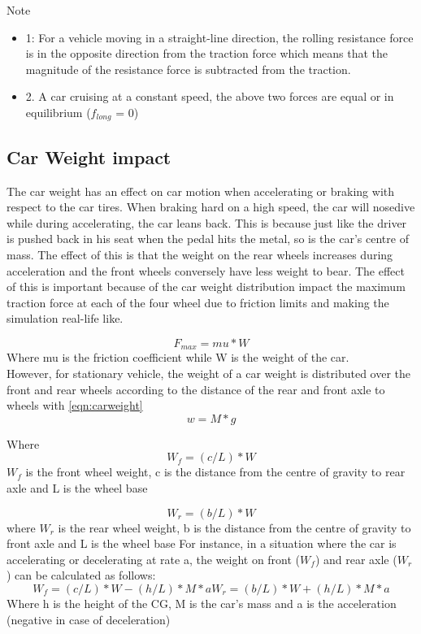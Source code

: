 \documentclass{book}
\begin{document}
Note
\begin{itemize}
    \item 1: For a vehicle moving in a straight-line direction, the rolling resistance force is in the opposite direction from the traction force which means that the magnitude of the resistance force is subtracted from the traction.
    \item 2. A car cruising at a constant speed, the above two forces are equal or in equilibrium ($f_{long} $ = 0)
\end{itemize}



\subsection{Car Weight impact}
The car weight has an effect on car motion when accelerating or braking with respect to the car tires. When braking hard on a high speed, the car will nosedive while during accelerating, the car leans back.  This is because just like the driver is pushed back in his seat when the pedal hits the metal, so is the car's centre of mass. The effect of this is that the weight on the rear wheels increases during acceleration and the front wheels conversely have less weight to bear. The effect of this is important because of the car weight distribution impact the maximum traction force at each of the four wheel due to friction limits and making the simulation real-life like.

\begin{equation}
  F_{max} = mu * W
\end{equation}
Where mu is the friction coefficient while W is the weight of the car.\\
However, for stationary vehicle, the weight of a car weight is distributed over the front and rear wheels according to the distance of the rear and front axle to wheels with \ref{eqn:carweight}
\begin{equation}
  w= M * g
  \label{eqn:carweight}
\end{equation}

Where
\begin{equation}
  W_{f} = (c/L)* W
\end{equation}
$W_{f}$ is the front wheel weight, c is the distance from the centre of gravity to rear axle and L is the wheel base

\begin{equation}
   W_{r} = (b/L)* W
\end{equation}
where  $W_{r}$ is the rear wheel weight, b is the distance from the centre of gravity to front axle and L is the wheel base
For instance, in a situation where the car is accelerating or decelerating at rate a, the weight on front ($W_{f}$) and rear axle ($W_{r}$) can be calculated as follows:
   \begin{equation}
    W_{f} = (c/L)*W - (h/L)*M*a
    W_{r} = (b/L)*W + (h/L)*M*a
   \end{equation}
  Where h is the height of the CG, M is the car's mass and a is the acceleration (negative in case of deceleration)
\end{document}
